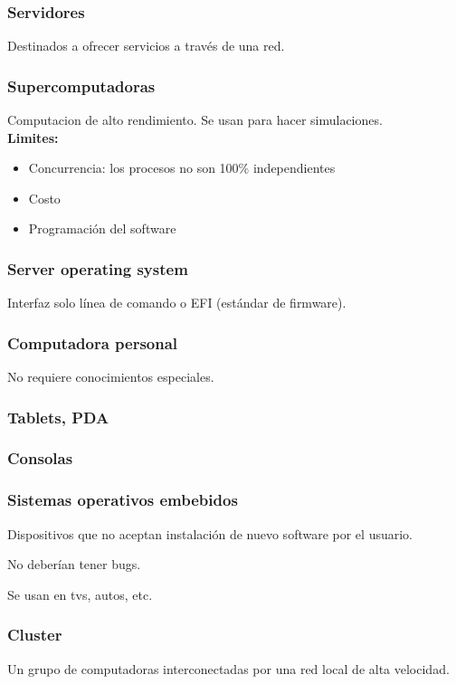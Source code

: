 \documentclass[a4paper, twoside]{article}
\begin{document}
\subsubsection{Servidores}
Destinados a ofrecer servicios a través de una red.

\subsubsection{Supercomputadoras}
Computacion de alto rendimiento. Se usan para hacer simulaciones.\\

\textbf{Limites:}
\begin{itemize}
	\item Concurrencia: los procesos no son 100\% independientes
	\item Costo
	\item Programación del software
\end{itemize}

\subsubsection{Server operating system}
Interfaz solo línea de comando o EFI (estándar de firmware).

\subsubsection{Computadora personal}
No requiere conocimientos especiales.

\subsubsection{Tablets, PDA}

\subsubsection{Consolas}

\subsubsection{Sistemas operativos embebidos}
Dispositivos que no aceptan instalación de nuevo software por el usuario.

No deberían tener bugs.

Se usan en tvs, autos, etc.

\subsubsection{Cluster}
Un grupo de computadoras interconectadas por una red local de alta velocidad.
\end{document}
